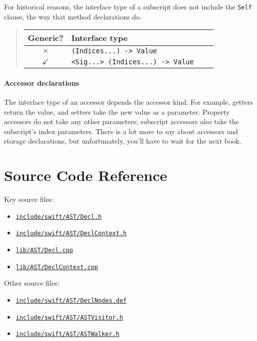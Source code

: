 \documentclass[a4paper,headsepline,bibliography=totoc,toc=flat,fleqn,twoside=semi]{scrbook}
\theoremstyle{definition}
\theoremstyle{definition}
\theoremstyle{definition}
\newcommand{\SourceFile}[1]{\href{https://github.com/apple/swift/tree/main/#1}{\texttt{#1}}}
\begin{document}
For historical reasons, the interface type of a subscript does not include the \texttt{Self} clause, the way that method declarations do.

\begin{quote}
\begin{tabular}{|c|l|l|l|}
\hline
Generic?&Interface type\\
\hline
\hline
$\times$&\texttt{(Indices...)\ -> Value}\\
$\checkmark$&\texttt{<Sig...>\ (Indices...)\ -> Value}\\
\hline
\end{tabular}
\end{quote}

\paragraph{Accessor declarations}

The interface type of an accessor depends the accessor kind. For example, getters return the value, and setters take the new value as a parameter. Property accessors do not take any other parameters; subscript accessors also take the subscript's index parameters. There is a lot more to say about accessors and storage declarations, but unfortunately, you'll have to wait for the next book.

\section{Source Code Reference}\label{declarationssourceref}

Key source files:
\begin{itemize}
\item \SourceFile{include/swift/AST/Decl.h}
\item \SourceFile{include/swift/AST/DeclContext.h}
\item \SourceFile{lib/AST/Decl.cpp}
\item \SourceFile{lib/AST/DeclContext.cpp}
\end{itemize}
Other source files:
\begin{itemize}
\item \SourceFile{include/swift/AST/DeclNodes.def}
\item \SourceFile{include/swift/AST/ASTVisitor.h}
\item \SourceFile{include/swift/AST/ASTWalker.h}
\end{itemize}
\end{document}
